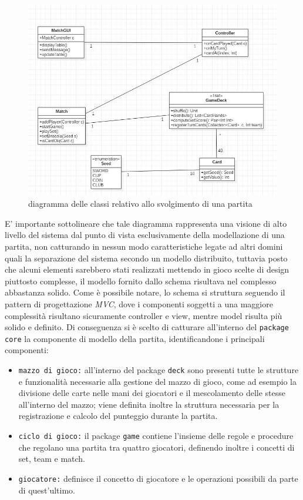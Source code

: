 \begin{figure}[H]
  \includegraphics[width=\textwidth,height=\textheight,keepaspectratio]{initialArchitecture}
   \caption{diagramma delle classi relativo allo svolgimento di una partita}
\end{figure}

 E' importante sottolineare che tale diagramma rappresenta una visione di alto livello del sistema dal punto di vista esclusivamente della modellazione di una partita, non catturando in nessun modo caratteristiche legate ad altri domini quali la separazione del sistema secondo un modello distribuito, tuttavia posto che alcuni elementi sarebbero stati realizzati mettendo in gioco scelte di design piuttosto complesse, il modello fornito dallo schema risultava nel complesso abbastanza solido.
 Come è possibile notare, lo schema si struttura seguendo il pattern di progettazione \textit{MVC}, dove i componenti soggetti a una maggiore complessità risultano sicuramente controller e view, mentre model risulta più solido e definito.
 Di conseguenza si è scelto di catturare all'interno del \texttt{package core} la componente di modello della partita, identificandone i principali componenti:

\begin{itemize}
  \item{\texttt{mazzo di gioco:}} all'interno del package \texttt{deck} sono presenti tutte le strutture e funzionalità necessarie alla gestione del mazzo di gioco, come ad esempio la divisione delle carte nelle mani dei giocatori e il mescolamento delle stesse all'interno del mazzo; viene definita inoltre la struttura necessaria per la registrazione e calcolo del punteggio durante la partita.


  \item{\texttt{ciclo di gioco:}} il package \texttt{game} contiene l'insieme delle regole e procedure che regolano una partita tra quattro giocatori, definendo inoltre i concetti di set, team e match.

  \item{\texttt{giocatore:}} definisce il concetto di giocatore e le operazioni possibili da parte di quest'ultimo.

\end{itemize}

